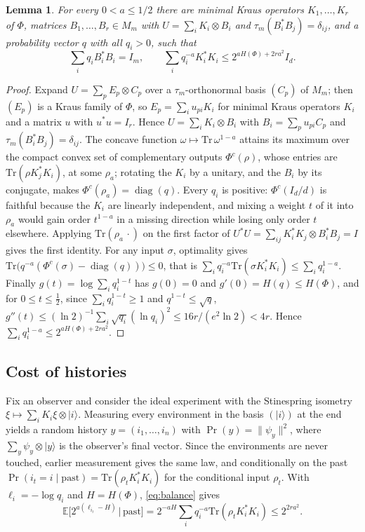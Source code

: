 \documentclass[11pt,a4paper]{article}
\theoremstyle{plain}
\newtheorem{lemma}[theorem]{Lemma}
\theoremstyle{definition}
\theoremstyle{remark}
\DeclareMathOperator{\diag}{diag}
\begin{document}
\begin{lemma}\label{lem:basis}
For every $0<a\le1/2$ there are minimal Kraus operators $K_1,\dots,K_r$ of $\Phi$, matrices $B_1,\dots,B_r\in M_m$ with
$U=\sum_iK_i\otimes B_i$ and $\tau_m(B_i^*B_j)=\delta_{ij}$, and a probability vector $q$ with all $q_i>0$, such that
\begin{equation}\label{eq:balance}
\sum_iq_iB_i^*B_i=I_m,\qquad \sum_iq_i^{-a}K_i^*K_i\le2^{aH(\Phi)+2ra^2}I_d .
\end{equation}
\end{lemma}

\begin{proof}
Expand $U=\sum_pE_p\otimes C_p$ over a $\tau_m$-orthonormal basis $(C_p)$ of $M_m$; then $(E_p)$ is a Kraus family of
$\Phi$, so $E_p=\sum_iu_{pi}K_i$ for minimal Kraus operators $K_i$ and a matrix $u$ with $u^*u=I_r$. Hence
$U=\sum_iK_i\otimes B_i$ with $B_i=\sum_pu_{pi}C_p$ and $\tau_m(B_i^*B_j)=\delta_{ij}$. The concave function
$\omega\mapsto\mathrm{Tr}\,\omega^{1-a}$ attains its maximum over the compact convex set of complementary outputs
$\Phi^c(\rho)$, whose entries are $\mathrm{Tr}(\rho K_j^*K_i)$, at some $\rho_a$; rotating the $K_i$ by a unitary, and the $B_i$ by its
conjugate, makes $\Phi^c(\rho_a)=\diag(q)$. Every $q_i$ is positive: $\Phi^c(I_d/d)$ is faithful because the $K_i$ are linearly
independent, and mixing a weight $t$ of it into $\rho_a$ would gain order $t^{1-a}$ in a missing direction while losing only
order $t$ elsewhere. Applying $\mathrm{Tr}(\rho_a\,\cdot)$ on the first factor of $U^*U=\sum_{ij}K_i^*K_j\otimes B_i^*B_j=I$ gives the
first identity. For any input $\sigma$, optimality gives $\mathrm{Tr}\big(q^{-a}(\Phi^c(\sigma)-\diag(q))\big)\le0$, that is
$\sum_iq_i^{-a}\mathrm{Tr}(\sigma K_i^*K_i)\le\sum_iq_i^{1-a}$. Finally $g(t)=\log\sum_iq_i^{1-t}$ has $g(0)=0$ and
$g'(0)=H(q)\le H(\Phi)$, and for $0\le t\le\frac12$, since $\sum_iq_i^{1-t}\ge1$ and $q^{1-t}\le\sqrt q$,
$g''(t)\le(\ln2)^{-1}\sum_i\sqrt{q_i}(\ln q_i)^2\le16r/(e^2\ln2)<4r$. Hence $\sum_iq_i^{1-a}\le2^{aH(\Phi)+2ra^2}$.
\end{proof}

\subsection{Cost of histories}

Fix an observer and consider the ideal experiment with the Stinespring isometry $\xi\mapsto\sum_iK_i\xi\otimes|i\rangle$.
Measuring every environment in the basis $(|i\rangle)$ at the end yields a random history $y=(i_1,\dots,i_n)$ with
$\Pr(y)=\|\psi_y\|^2$, where $\sum_y\psi_y\otimes|y\rangle$ is the observer's final vector. Since the environments are
never touched, earlier measurement gives the same law, and conditionally on the past
$\Pr(i_t=i\mid\text{past})=\mathrm{Tr}(\rho_{t}K_i^*K_i)$ for the conditional input $\rho_t$. With $\ell_i=-\log q_i$ and $H=H(\Phi)$,
\eqref{eq:balance} gives
\begin{equation}\label{eq:hoeffding}
\mathbb{E}\big[2^{a(\ell_{i_t}-H)}\,\big|\,\text{past}\big]=2^{-aH}\sum_iq_i^{-a}\mathrm{Tr}(\rho_tK_i^*K_i)\le2^{2ra^2}.
\end{equation}
\end{document}
